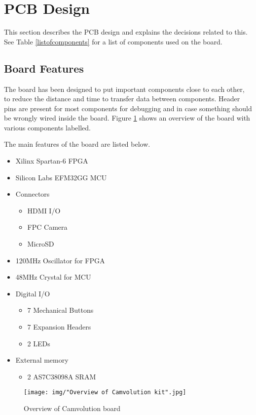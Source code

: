\section{PCB Design}
This section describes the PCB design and explains the decisions related to this.
See Table \ref{listofcomponents} for a list of components used on the board.

\subsection{Board Features}
The board has been designed to put important components close to each other,
to reduce the distance and time to transfer data between components.
Header pins are present for most components for debugging and in case something should be wrongly wired inside the board.
Figure \ref{fig:BoardLayout} shows an overview of the board with various components labelled.

The main features of the board are listed below.

\begin{itemize}
    \item Xilinx Spartan-6 FPGA
    \item Silicon Labs EFM32GG MCU
    \item Connectors
        \begin{itemize}
            \item HDMI I/O
            \item FPC Camera
            \item MicroSD
        \end{itemize}
    \item 120MHz Oscillator for FPGA
    \item 48MHz Crystal for MCU
    \item Digital I/O
        \begin{itemize}
            \item 7 Mechanical Buttons
            \item 7 Expansion Headers
            \item 2 LEDs
        \end{itemize}
    \item External memory
        \begin{itemize}
            \item 2 AS7C38098A SRAM
        \end{itemize}
\end{itemize}

\begin{figure}[h]
    \texttt{[image: img/"Overview of Camvolution kit".jpg]}
    \caption{Overview of Camvolution board}
    \label{fig:BoardLayout}
\end{figure}

